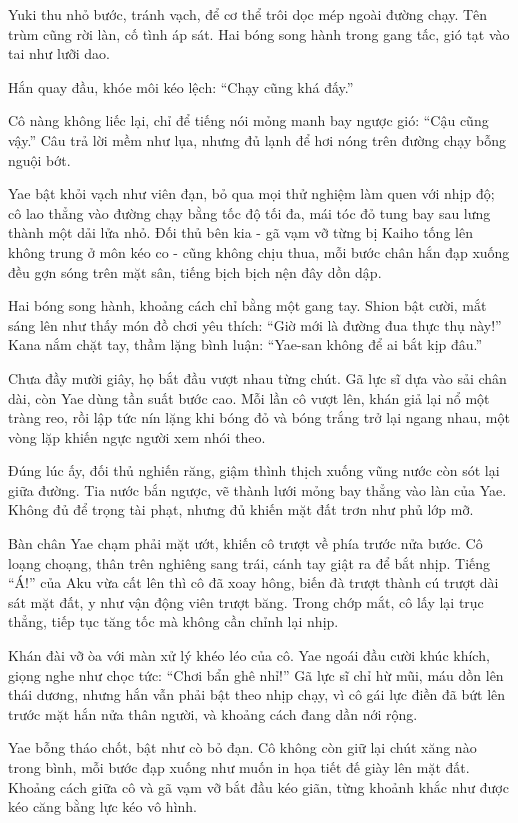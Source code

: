 \documentclass[../main.tex]{subfiles}
\begin{document}
Yuki thu nhỏ bước, tránh vạch, để cơ thể trôi dọc mép ngoài đường chạy. Tên trùm cũng rời làn, cố tình áp sát. Hai bóng song hành trong gang tấc, gió tạt vào tai như lưỡi dao.

Hắn quay đầu, khóe môi kéo lệch: ``Chạy cũng khá đấy.''

Cô nàng không liếc lại, chỉ để tiếng nói mỏng manh bay ngược gió: ``Cậu cũng vậy.'' Câu trả lời mềm như lụa, nhưng đủ lạnh để hơi nóng trên đường chạy bỗng nguội bớt.

Yae bật khỏi vạch như viên đạn, bỏ qua mọi thử nghiệm làm quen với nhịp độ; cô lao thẳng vào đường chạy bằng tốc độ tối đa, mái tóc đỏ tung bay sau lưng thành một dải lửa nhỏ. Đối thủ bên kia - gã vạm vỡ từng bị Kaiho tống lên không trung ở môn kéo co - cũng không chịu thua, mỗi bước chân hắn đạp xuống đều gợn sóng trên mặt sân, tiếng bịch bịch nện đây dồn dập.

Hai bóng song hành, khoảng cách chỉ bằng một gang tay. Shion bật cười, mắt sáng lên như thấy món đồ chơi yêu thích: ``Giờ mới là đường đua thực thụ này!'' Kana nắm chặt tay, thầm lặng bình luận: ``Yae-san không để ai bắt kịp đâu.''

Chưa đầy mười giây, họ bắt đầu vượt nhau từng chút. Gã lực sĩ dựa vào sải chân dài, còn Yae dùng tần suất bước cao. Mỗi lần cô vượt lên, khán giả lại nổ một tràng reo, rồi lập tức nín lặng khi bóng đỏ và bóng trắng trở lại ngang nhau, một vòng lặp khiến ngực người xem nhói theo.

Đúng lúc ấy, đối thủ nghiến răng, giậm thình thịch xuống vũng nước còn sót lại giữa đường. Tia nước bắn ngược, vẽ thành lưới mỏng bay thẳng vào làn của Yae. Không đủ để trọng tài phạt, nhưng đủ khiến mặt đất trơn như phủ lớp mỡ.

Bàn chân Yae chạm phải mặt ướt, khiến cô trượt về phía trước nửa bước. Cô loạng choạng, thân trên nghiêng sang trái, cánh tay giật ra để bắt nhịp. Tiếng ``Á!'' của Aku vừa cất lên thì cô đã xoay hông, biến đà trượt thành cú trượt dài sát mặt đất, y như vận động viên trượt băng. Trong chớp mắt, cô lấy lại trục thẳng, tiếp tục tăng tốc mà không cần chỉnh lại nhịp.

Khán đài vỡ òa với màn xử lý khéo léo của cô. Yae ngoái đầu cười khúc khích, giọng nghe như chọc tức: ``Chơi bẩn ghê nhỉ!'' Gã lực sĩ chỉ hừ mũi, máu dồn lên thái dương, nhưng hắn vẫn phải bật theo nhịp chạy, vì cô gái lực điền đã bứt lên trước mặt hắn nửa thân người, và khoảng cách đang dần nới rộng.

Yae bỗng tháo chốt, bật như cò bỏ đạn. Cô không còn giữ lại chút xăng nào trong bình, mỗi bước đạp xuống như muốn in họa tiết đế giày lên mặt đất. Khoảng cách giữa cô và gã vạm vỡ bắt đầu kéo giãn, từng khoảnh khắc như được kéo căng bằng lực kéo vô hình.
\end{document}
